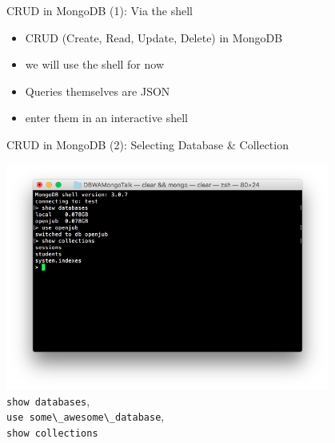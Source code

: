 \begin{frame}{CRUD in MongoDB (1): Via the shell}
  \begin{itemize}
      \item CRUD (Create, Read, Update, Delete) in MongoDB
      \item we will use the shell for now
      \item Queries themselves are JSON
      \item enter them in an interactive shell
  \end{itemize}
\end{frame}

\begin{frame}{CRUD in MongoDB (2): Selecting Database \& Collection}
  \begin{center}
    \includegraphics[width=0.80\textwidth]{imgs/shell_basic}\\\noindent
    \lstinline{show databases}, \\\noindent
    \lstinline{use some\_awesome\_database}, \\\noindent
    \lstinline{show collections}
  \end{center}
\end{frame}

